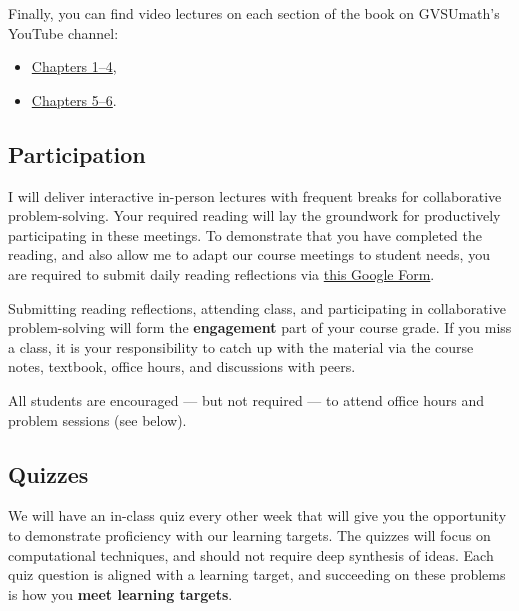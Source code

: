\documentclass[11pt,twoside]{amsart}
\begin{document}
Finally, you can find video lectures on each section of the book on GVSUmath's YouTube channel:
\begin{itemize}
\item \href{https://www.youtube.com/playlist?list=PL9bIjQJDwfGuXQHuS5Jkmum_CFILoCZX-}{Chapters 1--4},
\item \href{https://www.youtube.com/playlist?list=PL9bIjQJDwfGtewW75Nw7PnGNSkfqwAm3v}{Chapters 5--6}.
\end{itemize}


\subsection*{Participation}
I will deliver interactive in-person lectures with frequent breaks for collaborative problem-solving. Your required reading will lay the groundwork for productively participating in these meetings. To demonstrate that you have completed the reading, and also allow me to adapt our course meetings to student needs, you are required to submit daily reading reflections via \href{https://docs.google.com/forms/d/e/1FAIpQLSd96ciBCGuT8PwRP9BCgPyGX9RjLKlX3jA72CQhwt1rdRaRDg/viewform?usp=sharing&ouid=109824948403640299404}{this Google Form}. 

Submitting reading reflections, attending class, and participating in collaborative problem-solving will form the \textbf{engagement} part of your course grade. If you miss a class, it is your responsibility to catch up with the material via the course notes, textbook, office hours, and discussions with peers.

All students are encouraged --- but not required --- to attend office hours and problem sessions (see below).

\subsection*{Quizzes}\label{quiz}
We will have an in-class quiz every other week that will give you the opportunity to demonstrate proficiency with our learning targets. The quizzes will focus on computational techniques, and should not require deep synthesis of ideas. Each quiz question is aligned with a learning target, and succeeding on these problems is how you \textbf{meet learning targets}.
\end{document}
